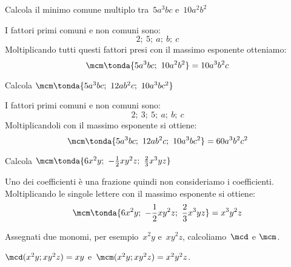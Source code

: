 \begin{exrig}
 \begin{esempio}
Calcola il minimo comune multiplo tra~\(5a^{3}bc\) e~\(10a^{2}b^{2}\) 

I fattori primi comuni e non comuni sono:
\[2;~5;~a;~b;~c\]
Moltiplicando tutti questi fattori presi con il massimo esponente otteniamo:
\[\mcm\tonda{5a^{3}bc;~10a^{2}b^{2}} = 10a^{3}b^{2}c\]
 \end{esempio}
% 
% 
% 
% 
 \begin{esempio}
Calcola \(\mcm \tonda{5a^{3}bc;~12ab^{2}c;~10a^{3}bc^{2}}\)

I fattori primi comuni e non comuni sono:
\[2;~3;~5;~a;~b;~c\]
Moltiplicandoli con il massimo esponente si ottiene:
\[\mcm \tonda{5a^{3}bc;~12ab^{2}c;~10a^{3}bc^{2}} = 60a^{3}b^{2}c^{2}\]
 \end{esempio}

 \begin{esempio}
Calcola \(\mcm \tonda{6x^{2}y;~-\frac{1}{2}xy^{2}z;~\frac{2}{3}x^{3}yz}\)

Uno dei coefficienti è una frazione quindi non consideriamo i coefficienti.
Moltiplicando le singole lettere con il massimo esponente si ottiene:
\[\mcm \tonda{6x^{2}y;~-\frac{1}{2}xy^{2}z;~\frac{2}{3}x^{3}yz} = 
x^{3}y^{2}z\]
 \end{esempio}
\end{exrig}

Assegnati due monomi, per esempio~\(x^{2}y\) e~\(xy^{2}z\),
calcoliamo~\(\mcd\) e \(\mcm\).

\(\mcd (x^{2}y;xy^{2}z)=xy\) e~\(\mcm (x^{2}y;xy^{2}z)=x^{2}y^{2}z\).

